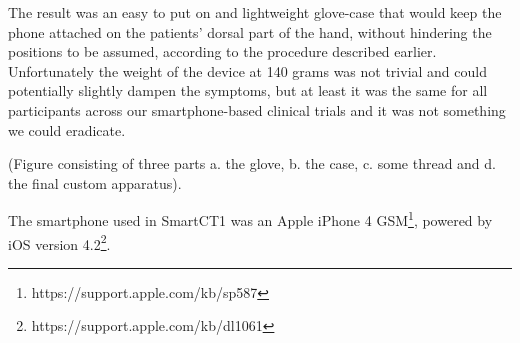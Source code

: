 The result was an easy to put on and lightweight glove-case that would keep the phone attached on the patients' dorsal part of the hand, without hindering the positions to be assumed, according to the procedure described earlier. Unfortunately the weight of the device at 140 grams was not trivial and could potentially slightly dampen the symptoms, but at least it was the same for all participants across our smartphone-based clinical trials and it was not something we could eradicate. 

(\textcolor{BurntOrange}{Figure consisting of three parts a. the glove, b. the case, c. some thread and d. the final custom apparatus}).

The smartphone used in \gls{SmartCT1} was an Apple iPhone 4 GSM\footnote{https://support.apple.com/kb/sp587}, powered by iOS version 4.2\footnote{https://support.apple.com/kb/dl1061}. 

